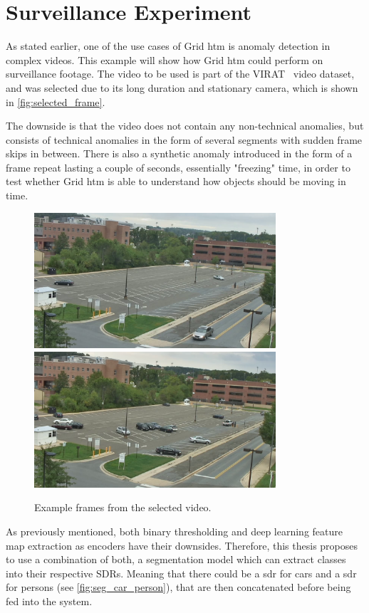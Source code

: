 \section{Surveillance Experiment}
As stated earlier, one of the use cases of Grid \gls*{htm} is anomaly detection in complex videos. This example will show how Grid \gls*{htm} could perform on surveillance footage.
The video to be used is part of the VIRAT~\cite{VIRAT} video dataset, and was selected due to its long duration and stationary camera, which is shown in \autoref{fig:selected_frame}.
\par
The downside is that the video does not contain any non-technical anomalies, but consists of technical anomalies in the form of several segments with sudden frame skips in between. There is also a synthetic anomaly introduced in the form of a frame repeat lasting a couple of seconds, essentially "freezing" time, in order to test whether Grid \gls*{htm} is able to understand how objects should be moving in time.
\begin{figure}[H]
    \centering
    \includegraphics[width=0.8\textwidth]{resources/methodology/original.png}
    \includegraphics[width=0.8\textwidth]{resources/experiments/surveillance/parking_frame.png}
    \caption[Example Frames]{Example frames from the selected video.}
    \label{fig:selected_frame}
\end{figure}
As previously mentioned, both binary thresholding and deep learning feature map extraction as encoders have their downsides. Therefore, this thesis proposes to use a combination of both, a segmentation model which can extract classes into their respective SDRs. Meaning that there could be a \gls*{sdr} for cars and a \gls*{sdr} for persons (see \autoref{fig:seg_car_person}), that are then concatenated before being fed into the system.
